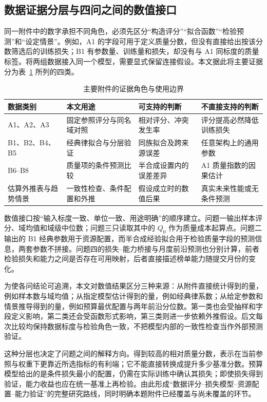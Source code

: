 \subsection{数据证据分层与四问之间的数值接口}
同一附件中的数字承担不同角色，必须先区分“构造评分”“拟合函数”“检验预测”和“设定情景”。例如，A1 的字段可用于定义质量分数，但没有直接给出按该分数筛选后的训练损失；B1 有参数量、训练量和损失，却没有与 A1 同标度的质量标签。将两组数据接入同一个模型，需要显式保留连接假设。本文据此将主要证据分为表~\ref{tab:evidence-levels} 所列的四类。

\begin{table}[!htbp]
\centering\songti{}
\caption{主要附件的证据角色与使用边界}
\label{tab:evidence-levels}
\begin{tabular}{@{}>{\raggedright\arraybackslash}p{2.5cm}>{\raggedright\arraybackslash}p{4.2cm}>{\raggedright\arraybackslash}p{4.2cm}>{\raggedright\arraybackslash}p{3.5cm}@{}}
\toprule
数据类别 & 本文用途 & 可支持的判断 & 不直接支持的判断 \\
\midrule
A1、A2、A3 & 固定参照评分与同名域对照 & 相对评分、冲突发生率 & 评分提高必然降低训练损失 \\
B1、B2、B4、B5 & 经典律拟合与分层验证 & 同族拟合及跨来源误差 & 任意架构上的通用参数 \\
B6--B8 & 质量项的条件预测比较 & 半合成设置内的误差差异 & A1 质量指数的因果估计 \\
估算外推表与趋势情景 & 一致性检查、条件配置和外推 & 假设成立时的数值后果 & 真实未来性能或无条件预测 \\
\bottomrule
\end{tabular}
\end{table}

数值接口按“输入标度一致、单位一致、用途明确”的顺序建立。问题一输出样本评分、域均值和域级中位数；问题三只读取其中的 $Q_0$ 作为质量成本起算点。问题二输出的 B1 经典参数用于资源配置，而半合成经验拟合用于检验质量字段的预测信息，两套参数不拼接。问题四的损失--能力桥接与月度前沿预测也分别计算，前者检验损失和能力之间是否存在可用映射，后者直接描述榜单能力随提交月份的变化。

为使各问结论可追溯，本文对数值结果区分三种来源：从附件直接统计得到的量，例如样本数与域均值；从指定模型估计得到的量，例如经典律系数；从给定参数和情景推导得到的量，例如预算最优配置与两年前沿分位数。第一类也会受抽样和字段定义影响，第二类还会受函数形式影响，第三类则进一步依赖外推假设。后文每次比较均保持数据标度与检验角色一致，不把模型内部的一致性检查当作外部预测验证。

这种分层也决定了问题之间的解释方向。得到较高的相对质量分数，表示在当前参照与权重下更靠近所选指标的有利端；它不能直接转换成提升多少基准分数。预算模型给出的是条件损失最小的配置，仍需在实际训练中确认其损失；即使损失得到验证，能力收益也应在统一基准上再检验。由此形成“数据评分--损失模型--资源配置--能力验证”的完整研究路线，同时明确本题附件已经覆盖与尚未覆盖的环节。
